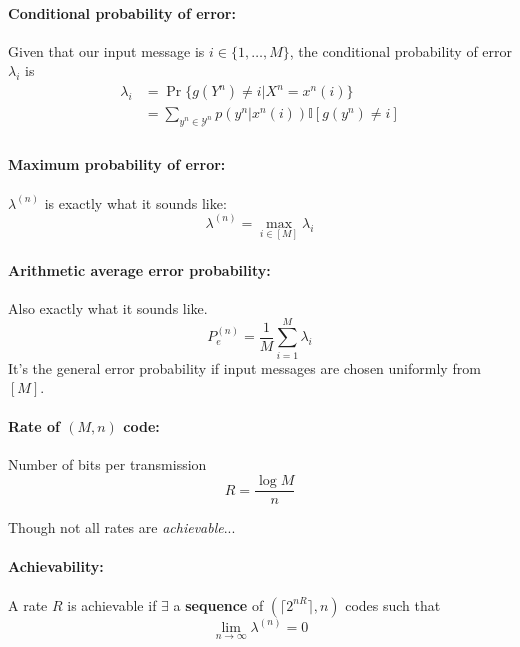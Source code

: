 \documentclass[a4paper,12pt]{report}
\begin{document}
\paragraph{Conditional probability of error: } Given that our input message is
$i \in \{1, \dots, M\}$, the conditional probability of error $\lambda_i$ is 
\begin{align}
	\lambda_i &= \Pr \{g(Y^n) \neq i | X^n = x^n(i)\} \\ 
	&= \sum_{y^n \in \mathcal Y^n} p(y^n | x^n(i)) \mathbb I [g(y^n) \neq i] \\
\end{align}

\paragraph{Maximum probability of error: } $\lambda^{(n)}$ is exactly what it
sounds like: 
\begin{equation}
	\lambda^{(n)} = \max_{i\in [M]} \lambda_i
\end{equation}

\paragraph{Arithmetic average error probability: } Also exactly what it sounds
like. 
\begin{equation}
	P_e^{(n)} = \frac{1}{M} \sum_{i=1}^{M} \lambda_i
\end{equation}
It's the general error probability if input messages are chosen uniformly from
$[M]$.


\paragraph{Rate of $(M, n)$ code: } Number of bits per transmission
\begin{equation}
R = \frac{\log M}{n} 
\end{equation}

Though not all rates are \textit{achievable}...

\paragraph{Achievability: } A rate $R$ is achievable if $\exists$ a
\textbf{sequence} of $(\lceil 2^{nR}\rceil, n)$ codes such that 
\begin{equation}
	\lim_{n\to \infty} \lambda^{(n)} = 0
\end{equation}
\end{document}
